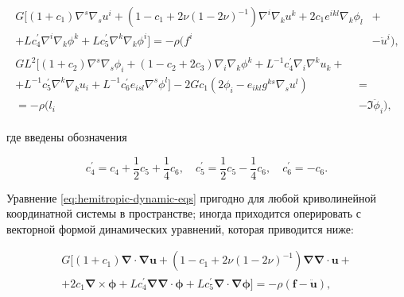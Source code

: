 \begin{equation}

\!\!\!\begin{array}{l}

\begin{aligned}

G[(1+c_1)\nabla^s\nabla_su^i+(1-c_1+2\nu(1-2\nu)^{-1})\nabla^i\nabla_ku^k+2c_1e^{ikl}\nabla_k\phi_l&+\\

+Lc^\prime_4\nabla^i\nabla_k\phi^k+Lc^\prime_5\nabla^k\nabla_k\phi^i]=-\rho(f^i&-{\ddot u^i}),

\end{aligned}\\[3mm]

%

\begin{aligned}

GL^2[(1+c_2)\nabla^s\nabla_s\phi_i+(1-c_2+2c_3)\nabla_i\nabla_k\phi^k+L^{-1}c^\prime_4\nabla_i\nabla^ku_k+~~&\\

+L^{-1}c^\prime_5\nabla^k\nabla_ku_i+L^{-1}c^\prime_6e_{isl}\nabla^s\phi^l]-2Gc_1(2\phi_i - e_{ikl}g^{ks}\nabla_su^l) &=\\

=-\rho(l_i&-{\mathfrak I}{\ddot\phi_i}),

\end{aligned}

\end{array}

\label{eq:hemitropic-dynamic-eqs}

\end{equation}

где введены обозначения

\begin{equation}

c^\prime_4=c_4+\dfrac{1}{2}c_5+\dfrac{1}{4}c_6,\quad 

c^\prime_5=\dfrac{1}{2}c_5-\dfrac{1}{4}c_6,\quad 

c^\prime_6=-c_6.

\end{equation}



Уравнение  \eqref{eq:hemitropic-dynamic-eqs} пригодно для любой криволинейной координатной системы в пространстве; иногда приходится оперировать с векторной формой динамических уравнений, которая приводится ниже:

\begin{multline}

G[(1+c_1){\boldsymbol\nabla}\cdot{\boldsymbol\nabla}{\mathbf u}+(1-c_1+2\nu(1-2\nu)^{-1}){\boldsymbol\nabla}{\boldsymbol\nabla}\cdot{\mathbf u}+ \\ +2c_1{\boldsymbol\nabla}\times{\boldsymbol\phi}+Lc^\prime_4{\boldsymbol\nabla}{\boldsymbol\nabla}\cdot{\boldsymbol\phi}

+Lc^\prime_5{\boldsymbol\nabla}\cdot{\boldsymbol\nabla}{\boldsymbol\phi}]=-\rho({\mathbf f}-\ddot{\mathbf u}),

\end{multline}



